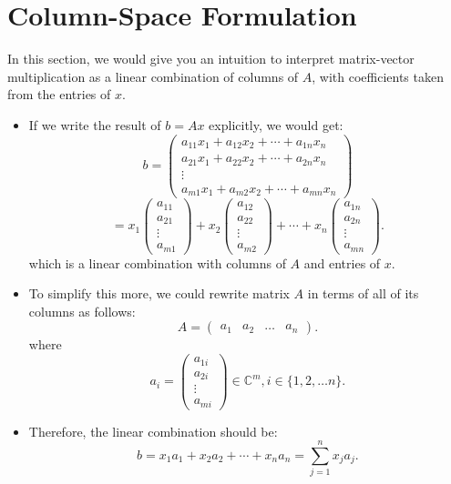 \section{Column-Space Formulation}
\label{ex1.2}
In this section, we would give you an intuition to interpret matrix-vector multiplication as a linear combination of columns of $A$, with coefficients taken from the entries of $x$.
 \begin{itemize}
\item If we write the result of $b = Ax$ explicitly, we would get:
\[
b = \begin{pmatrix} a_{11}x_1 + a_{12}x_2 + \cdots + a_{1n}x_n \\  a_{21}x_1 + a_{22}x_2 + \cdots + a_{2n}x_n\\ \vdots\\a_{m1}x_1 + a_{m2}x_2 + \cdots + a_{mn}x_n \end{pmatrix}
\]
\[
 = x_1\begin{pmatrix} a_{11}\\ a_{21} \\ \vdots\\ a_{m1} \end{pmatrix} + x_2 
\begin{pmatrix} a_{12}\\ a_{22} \\ \vdots\\ a_{m2} \end{pmatrix} + \cdots + x_n 
\begin{pmatrix} a_{1n}\\ a_{2n} \\ \vdots\\ a_{mn} \end{pmatrix}
.\]
which is a linear combination with columns of $A$ and entries of $x$.
 \item To simplify this more, we could rewrite matrix $A$ in terms of all of its columns as follows:
    \[
   A = \begin{pmatrix}
     a_1 & a_2 & \ldots & a_n
   \end{pmatrix}
   .\]
   where
   \[
   a_i = \begin{pmatrix} a_{1i}\\ a_{2i} \\  \vdots\\ a_{mi} \end{pmatrix} \in \mathbb{C}^{m}, i \in \{1, 2, \ldots n\} 
   .\]
  \item Therefore, the linear combination should be:
     \[
    b = x_1a_1 + x_2a_2 + \cdots + x_na_n = \sum_{j=1}^{n} x_j a_j
    .\] 
\end{itemize}
